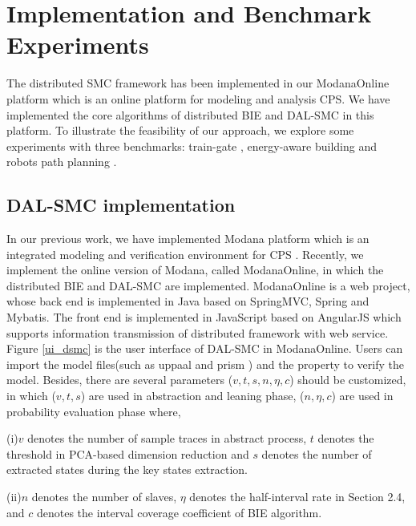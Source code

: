 \section{Implementation and Benchmark Experiments}
The distributed SMC framework has been implemented in our ModanaOnline platform which is an online platform for modeling and analysis CPS. We have implemented the core algorithms of distributed BIE and DAL-SMC in this platform. To illustrate the feasibility of our approach, we explore some experiments with three benchmarks: train-gate \cite{David2015Uppaal}, energy-aware building \cite{david2012evaluation} and robots path planning \cite{Miura2000Modeling}.

\subsection{DAL-SMC implementation}
In our previous work, we have implemented Modana platform which is an integrated modeling and verification environment for CPS \cite{Cheng2015Modana}. Recently, we implement the online version of Modana, called ModanaOnline, in which the distributed BIE and DAL-SMC are implemented. ModanaOnline is a web project, whose back end is implemented in Java based on SpringMVC, Spring and Mybatis. The front end is implemented in JavaScript based on AngularJS which supports information transmission of distributed framework with web service. Figure \ref{ui_dsmc} is the user interface of DAL-SMC in ModanaOnline. Users can import the model files(such as uppaal \cite{Behrmann2006UPPAAL} and prism \cite{Kwiatkowska2002PRISM}) and the property to verify the model. Besides, there are several parameters ($v,t,s,n,\eta,c$) should be customized, in which ($v,t,s$) are used in abstraction and leaning phase, ($n,\eta,c$) are used in probability evaluation phase where,

(i)$v$ denotes the number of sample traces in abstract process, $t$ denotes the threshold in PCA-based dimension reduction and $s$ denotes the number of extracted states during the key states extraction.

(ii)$n$ denotes the number of slaves, $\eta$ denotes the half-interval rate in Section 2.4, and $c$ denotes the interval coverage coefficient of BIE algorithm.

